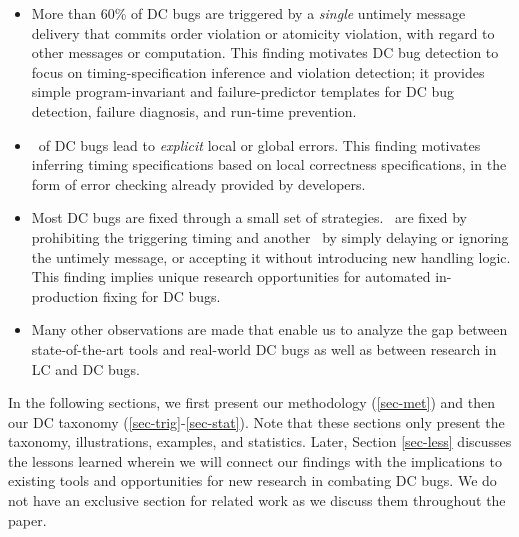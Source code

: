 \begin{itemize}
\item More than 60\% of DC bugs are triggered by a {\em single} untimely
message delivery that commits order violation or atomicity violation,
with regard to other messages or computation.  This finding motivates
DC bug detection to focus on timing-specification inference and
violation detection; it provides simple program-invariant and
failure-predictor templates for DC bug detection, failure diagnosis,
and run-time prevention.

\item \pctErrExp\ of DC bugs lead to {\em explicit} local or global
errors.  This finding motivates inferring timing specifications based
on local correctness specifications, in the form of error checking
already provided by developers.

\item Most DC bugs are fixed through a small set of strategies.
\pctFixTime\ are fixed by prohibiting the triggering timing and
another \pctFixHandEasy\ by simply delaying or ignoring the untimely
message, or accepting it without introducing new handling logic.
This finding implies unique research opportunities for automated
in-production fixing for DC bugs.


\item Many other observations are made that enable us to analyze the
gap between state-of-the-art tools and real-world DC bugs as well as
between research in LC and DC bugs.

\end{itemize}



\vfive In the following sections, we first present our methodology
(\sec\ref{sec-met}) and then our DC taxonomy
(\sec\ref{sec-trig}-\sec\ref{sec-stat}).
Note that these sections only present the taxonomy, illustrations,
examples, and statistics.  Later, Section \sec\ref{sec-less} discusses
the lessons learned wherein we will connect our findings with the
implications to existing tools and opportunities for new research in
combating DC bugs.  We do not have an exclusive section for related
work as we discuss them throughout the paper.
\fi
